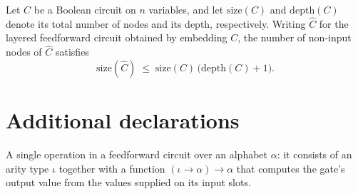 \begin{theorem}
\label{BoolCircuit.Circuit.toFeedForward_size_le}
\leanok
{}
Let $C$ be a Boolean circuit on $n$ variables, and let $\mathrm{size}(C)$ and
$\mathrm{depth}(C)$ denote its total number of nodes and its depth, respectively.
Writing $\widehat{C}$ for the layered feedforward circuit obtained by embedding $C$, the
number of non-input nodes of $\widehat{C}$ satisfies
\[
\mathrm{size}(\widehat{C}) \;\le\; \mathrm{size}(C)\,\bigl(\mathrm{depth}(C) + 1\bigr).
\]
\end{theorem}

\section{Additional declarations}

\begin{definition}
\label{BoolCircuit.GateOp}
\leanok
A single operation in a feedforward circuit over an alphabet $\alpha$: it consists
of an arity type $\iota$ together with a function $(\iota \to \alpha) \to \alpha$
that computes the gate's output value from the values supplied on its input slots.
\end{definition}
